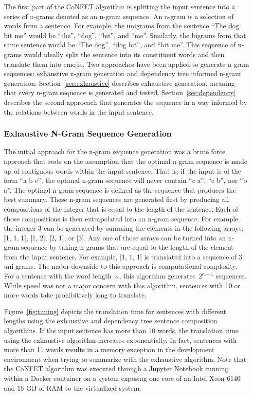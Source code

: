 \documentclass{article}[10]
\begin{document}
The first part of the CoNFET algorithm is splitting the input sentence into a series of n-grams denoted as an n-gram sequence. An n-gram is a selection of words from a sentence. For example, the unigrams from the sentence ``The dog bit me'' would be ``the'', ``dog'', ``bit'', and ``me''. Similarly, the bigrams from that same sentence would be ``The dog'', ``dog bit'', and ``bit me''. This sequence of n-grams would ideally split the sentence into its constituent words and then translate them into emojis. Two approaches have been applied to generate n-gram sequences: exhaustive n-gram generation and dependency tree informed n-gram generation. Section~\ref{sec:exhaustive} describes exhaustive generation, meaning that every n-gram sequence is generated and tested. Section~\ref{sec:dependency} describes the second approeach that generates the sequence in a way informed by the relations between words in the input sentence.

\subsubsection{Exhaustive N-Gram Sequence Generation\label{sec:exhaustive}}

The initial approach for the n-gram sequence generation was a brute force approach that rests on the assumption that the optimal n-gram sequence is made up of contiguous words within the input sentence. That is, if the input is of the form ``a b c'', the optimal n-gram sequence will never contain ``c a'', ``c b'', nor ``b a''. The optimal n-gram sequence is defined as the sequence that produces the best summary. These n-gram sequences are generated first by producing all compositions of the integer that is equal to the length of the sentence. Each of those compositions is then extrapolated into an n-gram sequence. For example, the integer 3 can be generated by summing the elements in the following arrays: [1, 1, 1], [1, 2], [2, 1], or [3]. Any one of those arrays can be turned into an n-gram sequence by taking n-grams that are equal to the length of the element from the input sentence. For example, [1, 1, 1] is translated into a sequence of 3 uni-grams. The major downside to this approach is computational complexity. For a sentence with the word length~\(n\), this algorithm generates~\(2^{n-1}\) sequences. While speed was not a major concern with this algorithm, sentences with 10 or more words take prohibitively long to translate.

Figure~\ref{fig:timing} depicts the translation time
for sentences with different lengths using the exhaustive and dependency
tree sentence composition algorithms. If the input sentence has more
than 10 words, the translation time using the exhaustive algorithm
increases exponentially. In fact, sentences with more than 11 words
results in a memory exception in the development environment when
trying to summarize with the exhaustive algorithm. Note that the CoNFET algorithm was executed through a Jupyter Notebook running within a Docker container on a system exposing one core of an Intel Xeon 6140 and 16 GB of RAM to the virtualized system.
\end{document}
